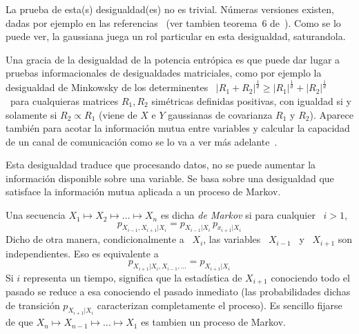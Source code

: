 La  prueba  de  esta(s)  desigualdad(es)  no es  trivial.   N\'umeras  versiones
existen,  dadas por  ejemplo  en las  referencias~\cite{Bla65, Sta59,  ShaWea64,
  Rio07,  Rio11,  Rio17,  CovTho06,  DemCov91,  Lie78,  VerGuo06}  (ver  tambien
teorema~6 de~\cite{Lie75}).   Como se  lo puede ver,  la gaussiana juega  un rol
particular en esta desigualdad, saturandola.



Una gracia de la desigualdad de la potencia entr\'opica es que puede dar lugar a
pruebas  informacionales  de  desigualdades  matriciales, como  por  ejemplo  la
desigualdad  de Minkowsky  de los  determinentes  \ $|R_1  + R_2|^{\frac1d}  \ge
|R_1|^{\frac1d}  +  |R_2|^{\frac1d}$  \  para cualquieras  matrices  $R_1,  R_2$
sim\'etricas definidas  positivas, con igualdad  si y solamente si  $R_2 \propto
R_1$  (viene de  $X$ e  $Y$ gaussianas  de covarianza  $R_1$ y  $R_2$).  Aparece
tambi\'en  para acotar  la informaci\'on  mutua  entre variables  y calcular  la
capacidad  de   un  canal  de  comunicaci\'on   como  se  lo  va   a  ver  m\'as
adelante~\cite{CovTho06, DemCov91, Rio07, Joh04}.





Esta  desigualdad  traduce  que  procesando  datos,  no  se  puede  aumentar  la
informaci\'on disponible sobre  una variable. Se basa sobre  una desigualdad que
satisface la informaci\'on mutua aplicada a un proceso de Markov.

\begin{definicion}
  Una secuencia  $X_1 \mapsto X_2 \mapsto  \ldots \mapsto X_n$ es  dicha {\it de
    Markov}   si   para  cualquier \   $i   >   1$,
  \[
  p_{X_{i-1},X_{i+1}|X_i} = p_{X_{i-1}|X_i} \, p_{x_{i+1}|X_i}
  \]
  Dicho de otra manera, condicionalmente a  \ $X_i$, las variables \ $X_{i-1}$ \
  y \ $X_{i+1}$ son independientes.  Eso es equivalente a
  \[
  p_{X_{i+1}|X_i,X_{i-1},\ldots} = p_{X_{i+1}|X_i}
  \]
  Si  $i$ representa  un tiempo,  significa  que la  estad\'istica de  $X_{i+1}$
  conociendo todo el pasado se reduce  a esa conociendo el pasado inmediato (las
  probabilidades   dichas   de   transici\'on   $p_{X_{i+1}|X_i}$   caracterizan
  completamente el  proceso).  Es sencillo  fijarse de que $X_n  \mapsto X_{n-1}
  \mapsto \ldots \mapsto X_1$ es tambien un proceso de Markov.
\end{definicion}

